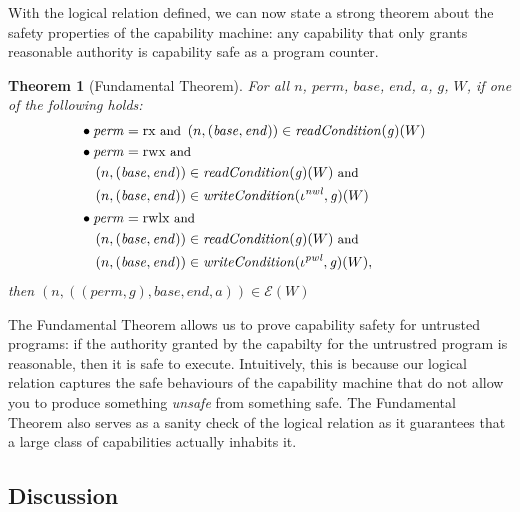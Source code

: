 \documentclass[compsoc,conference,letterpaper,fleqn]{IEEEtran}
\newtheorem{theorem}{Theorem}
\newcommand{\var}[1]{\mathit{#1}}
\newcommand{\gl}{\var{g}}
\newcommand{\addr}{\var{a}}
\newcommand{\start}{\var{base}}
\newcommand{\addrend}{\var{end}}
\newcommand{\perm}{\var{perm}}
\newcommand{\nwl}{\var{nwl}}
\newcommand{\pwl}{\var{pwl}}
\newcommand{\plainfun}[2]{
  \ifthenelse{\equal{#2}{}}
  {\mathit{#1}}
  {\mathit{#1}(#2)}
}
\newcommand{\readCond}[1]{\plainfun{readCondition}{#1}}
\newcommand{\writeCond}[1]{\plainfun{writeCondition}{#1}}
\newcommand{\asmType}{\plaindom{AsmType}}
\newcommand{\plaindom}[1]{\mathrm{#1}}
\newcommand{\intr}[2]{\mathcal{#1}}
\newcommand{\exprintr}[1]{\intr{E}{#1}}
\newcommand{\stder}{\exprintr{\asmType}}
\newcommand{\npair}[2][n]{\left(#1,#2 \right)}
\newcommand{\plainperm}[1]{\mathrm{#1}}
\newcommand{\exec}{\plainperm{rx}}
\newcommand{\rwx}{\plainperm{rwx}}
\newcommand{\rwlx}{\plainperm{rwlx}}
\begin{document}
With the logical relation defined, we can now state a strong theorem
about the safety properties of the capability machine:
any capability that only grants reasonable authority is capability
safe as a program counter.
\begin{theorem}[Fundamental Theorem]
  \label{thm:ftlr}
  For all $n$, $\perm$, $\start$, $\addrend$, $\addr$, $\gl$, $W$, if one of the following holds:
  \begin{align*}
      & \bullet
        \begin{aligned}[t]
        &\perm = \exec \text{\footnotesize{ and }}\npair{(\start,\addrend)} \in \readCond{}(\gl)(W)
      \end{aligned} \\
    & \bullet 
      \begin{aligned}[t]
        &\perm = \rwx \text{\footnotesize{ and }} \\
        &\npair{(\start,\addrend)} \in \readCond{}(\gl)(W) \text{\footnotesize{ and }}\\
        &\npair{(\start,\addrend)} \in \writeCond{}(\iota^\nwl,\gl)(W)
      \end{aligned} \\
    & \bullet 
      \begin{aligned}[t]
        &\perm = \rwlx \text{\footnotesize{ and }}\\
        &\npair{(\start,\addrend)} \in \readCond{}(\gl)(W) \text{\footnotesize{ and }}\\
        &\npair{(\start,\addrend)} \in \writeCond{}(\iota^\pwl,\gl)(W),
      \end{aligned}
  \end{align*}
  then $\npair{((\perm,\gl),\start,\addrend,\addr)} \in \stder(W)$
\end{theorem}
The Fundamental Theorem allows us to prove capability safety for
untrusted programs: if the authority granted by
the capabilty for the untrustred program is reasonable, then it is safe to
execute. Intuitively, this is because our logical relation captures the
safe behaviours of the capability machine that do not allow you to
produce something \emph{unsafe} from something safe. 
The Fundamental Theorem also serves as a sanity check of the
logical relation as it guarantees that a large class of capabilities
actually inhabits it.

\subsection{Discussion}
\end{document}
